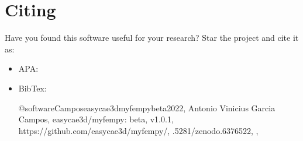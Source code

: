 \documentclass[letterpaper,10pt,english]{sphinxmanual}
\begin{document}
\chapter{Citing}
\label{\detokenize{index:citing}}
\sphinxAtStartPar
Have you found this software useful for your research? Star the project
and cite it as:
\begin{itemize}
\item {} 
\sphinxAtStartPar
APA:

\begin{sphinxVerbatim}[commandchars=\\\{\}]
         
\end{sphinxVerbatim}

\item {} 
\sphinxAtStartPar
BibTex:

\begin{sphinxVerbatim}[commandchars=\\\{\}]
@softwareCampos\PYGZus{}easycae\PYGZhy{}3d\PYGZus{}myfempy\PYGZus{}beta\PYGZus{}2022,
           Antonio Vinicius Garcia Campos,
           easycae\PYGZhy{}3d/myfempy: beta,
           v1.0.1,
           https://github.com/easycae\PYGZhy{}3d/myfempy/,
           .5281/zenodo.6376522,
           ,
           
\end{sphinxVerbatim}

\end{itemize}
\end{document}
